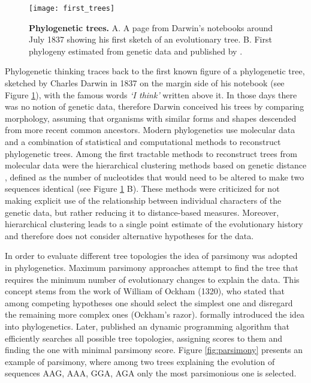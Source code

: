 \begin{figure}[H]
\centering
\texttt{[image: first\_trees]} 
\caption{
{ \footnotesize 
{\bf Phylogenetic trees.} A. A page from Darwin's notebooks around July 1837 showing his first sketch of an evolutionary tree.
B. First phylogeny estimated from genetic data and published by \cite{Fitch1967}.
}%
}
\label{fig:first_trees}
\end{figure}

Phylogenetic thinking traces back to the first known figure of a phylogenetic tree, sketched by Charles Darwin in 1837 on the margin side of his notebook (see Figure \ref{fig:first_trees}), with the famous words \emph{`I think'} written above it.
In those days there was no notion of genetic data, therefore Darwin conceived his trees by comparing morphology, assuming that organisms with similar forms and shapes descended from more recent common ancestors. %
Modern phylogenetics use molecular data and a combination of statistical and computational methods to reconstruct phylogenetic trees.
Among the first tractable methods to reconstruct trees from molecular data were the hierarchical clustering methods based on genetic distance \citep{Fitch1967}, defined as the number of nucleotides that would need to be altered to make two sequences identical (see Figure \ref{fig:first_trees} B).
These methods were criticized for not making explicit use of the relationship between individual characters of the genetic data, but rather reducing it to distance-based measures.
Moreover, hierarchical clustering leads to a single point estimate of the evolutionary history and therefore does not consider alternative hypotheses for the data.

In order to evaluate different tree topologies the idea of parsimony was adopted in phylogenetics. 
Maximum parsimony approaches attempt to find the tree that requires the minimum number of evolutionary changes to explain the data. %
This concept stems from the work of William of Ockham (1320), who stated that among competing hypotheses one should select the simplest one and disregard the remaining more complex ones (Ockham's razor).
\cite{Edwards1963} formally introduced the idea into phylogenetics.
Later, \cite{Fitch1971} published an dynamic programming algorithm that efficiently searches all possible tree topologies, assigning scores to them and finding the one with minimal parsimony score.
Figure \ref{fig:parsimony} presents an example of parsimony, where among two trees explaining the evolution of sequences {\color{green}AAG}, {\color{green}AAA}, {\color{green}GGA}, {\color{green}AGA} only the most parsimonious one is selected.

